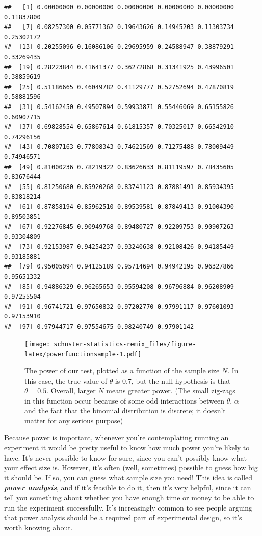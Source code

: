 \documentclass[
]{book}
\begin{document}
\begin{verbatim}
##   [1] 0.00000000 0.00000000 0.00000000 0.00000000 0.00000000 0.11837800
##   [7] 0.08257300 0.05771362 0.19643626 0.14945203 0.11303734 0.25302172
##  [13] 0.20255096 0.16086106 0.29695959 0.24588947 0.38879291 0.33269435
##  [19] 0.28223844 0.41641377 0.36272868 0.31341925 0.43996501 0.38859619
##  [25] 0.51186665 0.46049782 0.41129777 0.52752694 0.47870819 0.58881596
##  [31] 0.54162450 0.49507894 0.59933871 0.55446069 0.65155826 0.60907715
##  [37] 0.69828554 0.65867614 0.61815357 0.70325017 0.66542910 0.74296156
##  [43] 0.70807163 0.77808343 0.74621569 0.71275488 0.78009449 0.74946571
##  [49] 0.81000236 0.78219322 0.83626633 0.81119597 0.78435605 0.83676444
##  [55] 0.81250680 0.85920268 0.83741123 0.87881491 0.85934395 0.83818214
##  [61] 0.87858194 0.85962510 0.89539581 0.87849413 0.91004390 0.89503851
##  [67] 0.92276845 0.90949768 0.89480727 0.92209753 0.90907263 0.93304809
##  [73] 0.92153987 0.94254237 0.93240638 0.92108426 0.94185449 0.93185881
##  [79] 0.95005094 0.94125189 0.95714694 0.94942195 0.96327866 0.95651332
##  [85] 0.94886329 0.96265653 0.95594208 0.96796884 0.96208909 0.97255504
##  [91] 0.96741721 0.97650832 0.97202770 0.97991117 0.97601093 0.97153910
##  [97] 0.97944717 0.97554675 0.98240749 0.97901142
\end{verbatim}

\begin{figure}
\centering
\texttt{[image: schuster-statistics-remix\_files/figure-latex/powerfunctionsample-1.pdf]}
\caption{\label{fig:powerfunctionsample}The power of our test, plotted as a function of the sample size \(N\). In this case, the true value of \(\theta\) is 0.7, but the null hypothesis is that \(\theta = 0.5\). Overall, larger \(N\) means greater power. (The small zig-zags in this function occur because of some odd interactions between \(\theta\), \(\alpha\) and the fact that the binomial distribution is discrete; it doesn't matter for any serious purpose)}
\end{figure}

Because power is important, whenever you're contemplating running an experiment it would be pretty useful to know how much power you're likely to have. It's never possible to know for sure, since you can't possibly know what your effect size is. However, it's often (well, sometimes) possible to guess how big it should be. If so, you can guess what sample size you need! This idea is called \textbf{\emph{power analysis}}, and if it's feasible to do it, then it's very helpful, since it can tell you something about whether you have enough time or money to be able to run the experiment successfully. It's increasingly common to see people arguing that power analysis should be a required part of experimental design, so it's worth knowing about.
\end{document}
